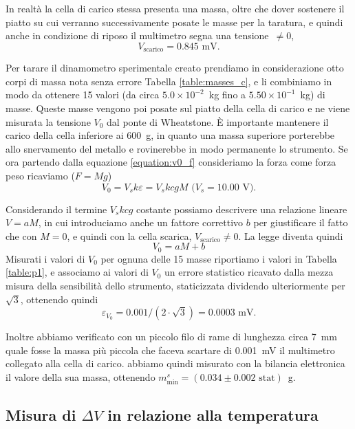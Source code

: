 \documentclass[italian, a4paper, 10pt, twocolumn]{../../style/lab_unige}
\newcommand{\reftab}[1]{Tabella {\ref{#1}}}%
\newcommand{\mstdErr}[1]{\varepsilon_{#1}}
\begin{document}
    
    In realtà la cella di carico stessa presenta una massa, oltre che dover sostenere il piatto su cui verranno successivamente posate le masse per la taratura, e quindi anche in condizione di riposo il multimetro segna una tensione~$\neq0$, 
    \[V_{\text{scarico}}=0.845\text{ mV.}\]

    Per tarare il dinamometro sperimentale creato prendiamo in considerazione otto corpi di massa nota senza errore \reftab{table:masses_c}, e li combiniamo in modo da ottenere 15 valori (da circa $5.0\times10^{-2}$~kg fino a $5.50\times10^{-1}$~kg) di masse. Queste masse vengono poi posate sul piatto della cella di carico e ne viene misurata la tensione $V_0$ dal ponte di Wheatstone. È importante mantenere il carico della cella inferiore ai 600~g, in quanto una massa superiore porterebbe allo snervamento del metallo e rovinerebbe in modo permanente lo strumento. 
    Se ora partendo dalla equazione \ref{equation:v0_f} consideriamo la forza come forza peso ricaviamo ($F=Mg$)
    \begin{equation}
        V_0=V_sk\varepsilon=V_skcgM\text{ ($V_s=10.00$~V).}\label{eqation:v0_mg}
    \end{equation}

    

    Considerando il termine $V_skcg$ costante possiamo descrivere una relazione lineare $V=aM$, in cui introduciamo anche un fattore correttivo $b$ per giustificare il fatto che con $M=0$, e quindi con la cella scarica, $V_{\text{scarico}}\neq0$. La legge diventa quindi
    \begin{equation}
        V_0=aM+b\label{equation:v0_m}
    \end{equation}
    Misurati i valori di $V_0$ per ognuna delle 15 masse riportiamo i valori in \reftab{table:p1}, e associamo ai valori di $V_0$ un errore statistico ricavato dalla mezza misura della sensibilità dello strumento, staticizzata dividendo ulteriormente per $\sqrt{3}$, ottenendo quindi \[\mstdErr{V_0} = 0.001/(2\cdot\sqrt{3})=0.0003\text{ mV.}\]

    Inoltre abbiamo verificato con un piccolo filo di rame di lunghezza circa 7~mm quale fosse la massa più piccola che faceva scartare di 0.001~mV il multimetro collegato alla cella di carico. abbiamo quindi misurato con la bilancia elettronica il valore della sua massa, ottenendo $m_{\text{min}}^s=(0.034\pm0.002\text{ stat})$~g.

    \subsection{Misura di $\Delta V$ in relazione alla temperatura}
\end{document}
